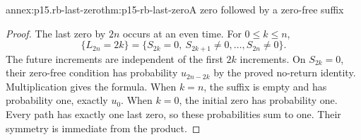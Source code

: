 \begin{annexitem}{annex:p15.rb-last-zero}{thm:p15-rb-last-zero}{A zero followed by a zero-free suffix}
\begin{proof}
The last zero by \(2n\) occurs at an even time.
For \(0\leq k\leq n\),
\[
 \{L_{2n}=2k\}
 =\{S_{2k}=0,\ S_{2k+1}\ne0,\ldots,S_{2n}\ne0\}.
 \]
The future increments are independent of the first \(2k\)
increments. On \(S_{2k}=0\), their zero-free condition has
probability \(u_{2n-2k}\) by the proved no-return identity.
Multiplication gives the formula. When \(k=n\), the suffix
is empty and has probability one, exactly \(u_0\).
When \(k=0\), the initial zero has probability one.
Every path has exactly one last zero, so these probabilities
sum to one. Their symmetry is immediate from the product.
\end{proof}
\end{annexitem}

